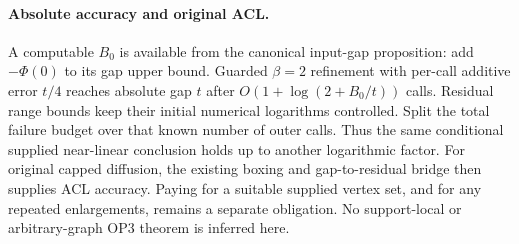 \paragraph{Absolute accuracy and original ACL.}
A computable $B_0$ is available from the canonical input-gap proposition:
add $-\Phi(0)$ to its gap upper bound. Guarded $\beta=2$ refinement
with per-call additive error $t/4$ reaches absolute gap $t$ after
$O(1+\log(2+B_0/t))$ calls. Residual range bounds keep their initial
numerical logarithms controlled. Split the total failure budget over
that known number of outer calls. Thus the same conditional supplied
near-linear conclusion holds up to another logarithmic factor.
For original capped diffusion, the existing boxing and gap-to-residual
bridge then supplies ACL accuracy. Paying for a suitable supplied vertex
set, and for any repeated enlargements, remains a separate obligation.
No support-local or arbitrary-graph OP3 theorem is inferred here.
